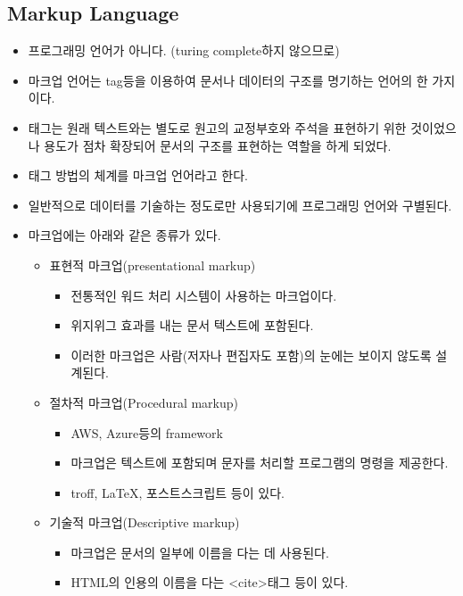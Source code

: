 \documentclass{article}
\begin{document}
\subsection{Markup Language}
\begin{itemize}
    \item 프로그래밍 언어가 아니다. (turing complete하지 않으므로)
    \item 마크업 언어는 tag등을 이용하여 문서나 데이터의 구조를 명기하는 언어의 한 가지이다.
    \item 태그는 원래 텍스트와는 별도로 원고의 교정부호와 주석을 표현하기 위한 것이었으나 용도가 점차 확장되어 문서의 구조를 표현하는 역할을 하게 되었다.
    \item 태그 방법의 체계를 마크업 언어라고 한다.
    \item 일반적으로 데이터를 기술하는 정도로만 사용되기에 프로그래밍 언어와 구별된다.
    \item 마크업에는 아래와 같은 종류가 있다.
    \begin{itemize}
        \item 표현적 마크업(presentational markup)
        \begin{itemize}
            \item 전통적인 워드 처리 시스템이 사용하는 마크업이다.
            \item 위지위그 효과를 내는 문서 텍스트에 포함된다.
            \item 이러한 마크업은 사람(저자나 편집자도 포함)의 눈에는 보이지 않도록 설계된다.
        \end{itemize}
        \item 절차적 마크업(Procedural markup)
        \begin{itemize}
            \item AWS, Azure등의 framework
            \item 마크업은 텍스트에 포함되며 문자를 처리할 프로그램의 명령을 제공한다.
            \item troff, \LaTeX, 포스트스크립트 등이 있다.
        \end{itemize}
        \item 기술적 마크업(Descriptive markup)
        \begin{itemize}
            \item 마크업은 문서의 일부에 이름을 다는 데 사용된다.
            \item HTML의 인용의 이름을 다는 <cite>태그 등이 있다.
        \end{itemize}
    \end{itemize}

\end{itemize}
\end{document}
